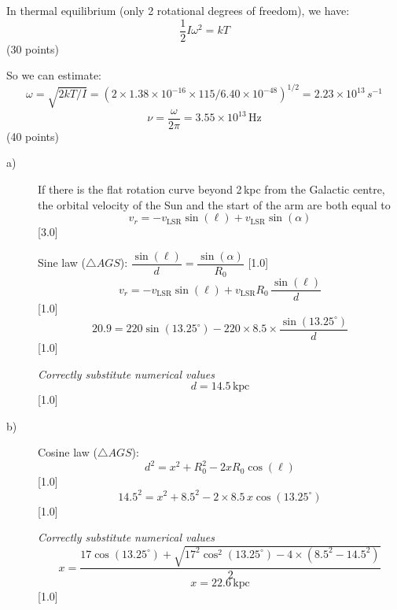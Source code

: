 In thermal equilibrium (only 2 rotational degrees of freedom), we have:
\[
  \frac{1}{2}I\omega^2 = kT
\]
\hfill(30 points)

So we can estimate:
\[
  \omega = \sqrt{2kT/I}
  = (2 \times 1.38\times10^{-16} \times 115/6.40\times10^{-48})^{1/2}
  = 2.23\times10^{13}\,s^{-1}
  \]
\[
  \nu = \frac{\omega}{2\pi} = 3.55\times10^{13}\,\mathrm{Hz}
\]
\hfill(40 points)

\begin{description}
\item[a)]
  If there is the flat rotation curve beyond 2\,kpc from the Galactic centre,
  the orbital velocity of the Sun and the start of the arm are both equal to
  \[
    v_r = -v_{\mathrm{LSR}}\sin(\ell) + v_{\mathrm{LSR}}\sin(\alpha)
  \]
  \hfill[3.0]

  Sine law ($\triangle AGS$):\quad
  $\dfrac{\sin(\ell)}{d} = \dfrac{\sin(\alpha)}{R_0}$ \hfill[1.0]
  \[
    v_r = -v_{\mathrm{LSR}}\sin(\ell) + v_{\mathrm{LSR}}R_0\,\frac{\sin(\ell)}{d}
  \]
  \hfill[1.0]
  \[
    20.9 = 220\sin(13.25^\circ) - 220\times8.5\times\frac{\sin(13.25^\circ)}{d}
  \]
  \hfill[1.0]

  \emph{Correctly substitute numerical values}
  \[
    d = 14.5\,\mathrm{kpc}
  \]
  \hfill[1.0]
\item[b)]
  Cosine law ($\triangle AGS$):
  \[
    d^2 = x^2 + R_0^2 - 2xR_0\cos(\ell)
  \]
  \hfill[1.0]
  \[
    14.5^2 = x^2 + 8.5^2 - 2\times8.5\,x\cos(13.25^\circ)
  \]
  \hfill[1.0]

  \emph{Correctly substitute numerical values}
  \[
    x = \frac{17\cos(13.25^\circ)
        + \sqrt{17^2\cos^2(13.25^\circ) - 4\times(8.5^2 - 14.5^2)}}{2}
  \]
  \[
    x = 22.6\,\mathrm{kpc}
  \]
  \hfill[1.0]
\end{description}

